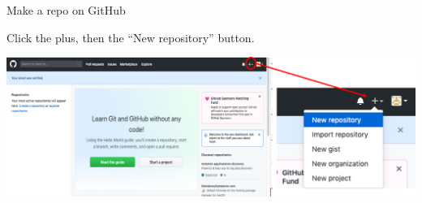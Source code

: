 \documentclass[
  ignorenonframetext,
]{beamer}
\begin{document}
\begin{frame}{Make a repo on GitHub}
\protect\hypertarget{make-a-repo-on-github}{}

Click the plus, then the ``New repository'' button.

\includegraphics{pres_figs/new_repo.png}

\end{frame}
\end{document}
